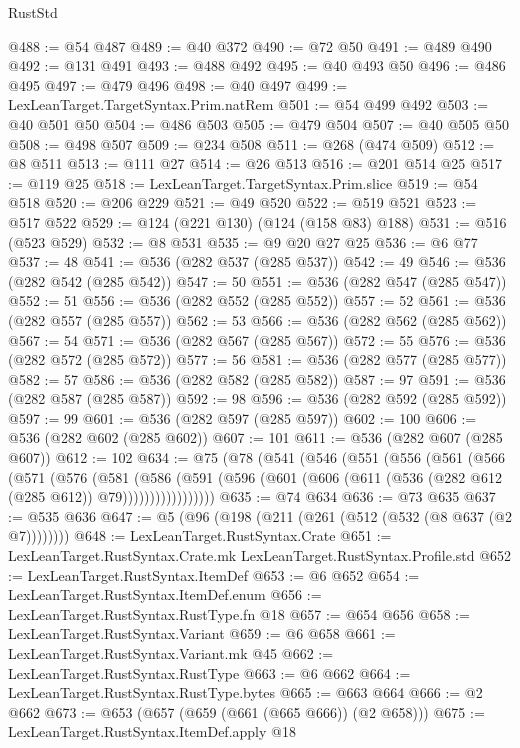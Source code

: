 \begin{lexlean}{RustStd}
\begin{coremodule}
@488 := @54 @487
@489 := @40 @372
@490 := @72 @50
@491 := @489 @490
@492 := @131 @491
@493 := @488 @492
@495 := @40 @493 @50
@496 := @486 @495
@497 := @479 @496
@498 := @40 @497
@499 := LexLeanTarget.TargetSyntax.Prim.natRem
@501 := @54 @499 @492
@503 := @40 @501 @50
@504 := @486 @503
@505 := @479 @504
@507 := @40 @505 @50
@508 := @498 @507
@509 := @234 @508
@511 := @268 (@474 @509)
@512 := @8 @511
@513 := @111 @27
@514 := @26 @513
@516 := @201 @514 @25
@517 := @119 @25
@518 := LexLeanTarget.TargetSyntax.Prim.slice
@519 := @54 @518
@520 := @206 @229
@521 := @49 @520
@522 := @519 @521
@523 := @517 @522
@529 := @124 (@221 @130) (@124 (@158 @83) @188)
@531 := @516 (@523 @529)
@532 := @8 @531
@535 := @9 @20 @27 @25
@536 := @6 @77
@537 := 48
@541 := @536 (@282 @537 (@285 @537))
@542 := 49
@546 := @536 (@282 @542 (@285 @542))
@547 := 50
@551 := @536 (@282 @547 (@285 @547))
@552 := 51
@556 := @536 (@282 @552 (@285 @552))
@557 := 52
@561 := @536 (@282 @557 (@285 @557))
@562 := 53
@566 := @536 (@282 @562 (@285 @562))
@567 := 54
@571 := @536 (@282 @567 (@285 @567))
@572 := 55
@576 := @536 (@282 @572 (@285 @572))
@577 := 56
@581 := @536 (@282 @577 (@285 @577))
@582 := 57
@586 := @536 (@282 @582 (@285 @582))
@587 := 97
@591 := @536 (@282 @587 (@285 @587))
@592 := 98
@596 := @536 (@282 @592 (@285 @592))
@597 := 99
@601 := @536 (@282 @597 (@285 @597))
@602 := 100
@606 := @536 (@282 @602 (@285 @602))
@607 := 101
@611 := @536 (@282 @607 (@285 @607))
@612 := 102
@634 := @75
    (@78
      (@541
        (@546
          (@551
            (@556
              (@561
                (@566
                  (@571
                    (@576
                      (@581
                        (@586
                          (@591
                            (@596
                              (@601 (@606 (@611 (@536 (@282 @612 (@285 @612)) @79)))))))))))))))))
@635 := @74 @634
@636 := @73 @635
@637 := @535 @636
@647 := @5 (@96 (@198 (@211 (@261 (@512 (@532 (@8 @637 (@2 @7))))))))
@648 := LexLeanTarget.RustSyntax.Crate
@651 := LexLeanTarget.RustSyntax.Crate.mk LexLeanTarget.RustSyntax.Profile.std
@652 := LexLeanTarget.RustSyntax.ItemDef
@653 := @6 @652
@654 := LexLeanTarget.RustSyntax.ItemDef.enum
@656 := LexLeanTarget.RustSyntax.RustType.fn @18
@657 := @654 @656
@658 := LexLeanTarget.RustSyntax.Variant
@659 := @6 @658
@661 := LexLeanTarget.RustSyntax.Variant.mk @45
@662 := LexLeanTarget.RustSyntax.RustType
@663 := @6 @662
@664 := LexLeanTarget.RustSyntax.RustType.bytes
@665 := @663 @664
@666 := @2 @662
@673 := @653 (@657 (@659 (@661 (@665 @666)) (@2 @658)))
@675 := LexLeanTarget.RustSyntax.ItemDef.apply @18

\end{coremodule}
\end{lexlean}
